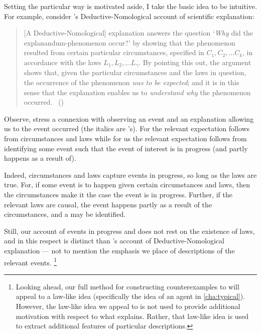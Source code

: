 \begin{note}
  Setting the particular way \progEx{} is motivated aside, I take the basic idea to be intuitive.
  For example, consider \citeauthor{Hempel:1965aa}'s Deductive-Nomological account of scientific explanation:
  \begin{quote}
    [A Deductive-Nomological] explanation answers the question
    `\emph{Why} did the explanandum-phenomenon occur?'
    by showing that the phenomenon resulted from certain particular circumstances, specified in \(C_{1}, C_{2}, \dots C_{k}\), in accordance with the laws \(L_{1}, L_{2}, \dots L_{\gamma}\).
    By pointing this out, the argument shows that, given the particular circumstances and the laws in question, the occurrence of the phenomenon \emph{was to be expected}; and it is in this sense that the explanation enables us to \emph{understand why} the phenomenon occurred.%
    \mbox{ }\hfill\mbox{(\citeyear[337]{Hempel:1965aa})}
  \end{quote}
  Observe, \citeauthor{Hempel:1965aa} stress a connexion with observing an event  and an explanation allowing us to  the event occurred (the italics are \citeauthor{Hempel:1965aa}'s).
  For \citeauthor{Hempel:1965aa} the relevant expectation follows from circumstances and laws while for us the relevant expectation follows from identifying some event such that the event of interest is in progress (and partly happens as a result of).

  Indeed, circumstances and laws capture events in progress, so long as the laws are true.
  For, if some event is to happen given certain circumstances and laws, then the circumstances make it the case the event is in progress.
  Further, if the relevant laws are causal, the event happens partly as a result of the circumstances, and a \se{} may be identified.

  Still, our account of events in progress and \se{} does not rest on the existence of laws, and in this respect \progExI{} is distinct than \citeauthor{Hempel:1965aa}'s account of Deductive-Nomological explanation --- not to mention the emphasis we place of descriptions of the relevant events.%
  \footnote{
    Looking ahead, our full method for constructing counterexamples to \issueInclusion{} will appeal to a law-like idea (specifically the idea of an agent \tC{} in \autoref{cha:typical}).
    However, the law-like idea we appeal to is not used to provide additional motivation with respect to what explains.
    Rather, that law-like idea is used to extract additional features of particular descriptions.
  }
\end{note}



